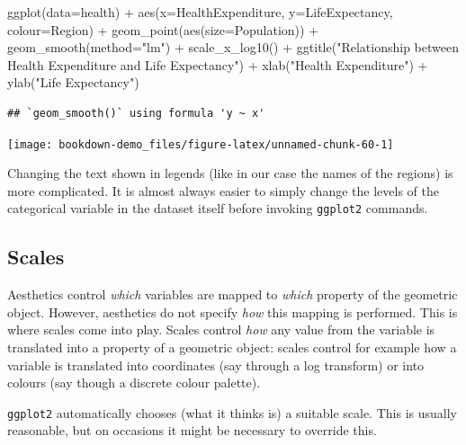 \documentclass[
]{book}
\newenvironment{Shaded}{\begin{snugshade}}{\end{snugshade}}
\newcommand{\AttributeTok}[1]{\textcolor[rgb]{0.77,0.63,0.00}{#1}}
\newcommand{\FunctionTok}[1]{\textcolor[rgb]{0.00,0.00,0.00}{#1}}
\newcommand{\NormalTok}[1]{#1}
\newcommand{\SpecialCharTok}[1]{\textcolor[rgb]{0.00,0.00,0.00}{#1}}
\newcommand{\StringTok}[1]{\textcolor[rgb]{0.31,0.60,0.02}{#1}}
\begin{document}
\begin{Shaded}
\begin{Highlighting}[]
\FunctionTok{ggplot}\NormalTok{(}\AttributeTok{data=}\NormalTok{health) }\SpecialCharTok{+} 
    \FunctionTok{aes}\NormalTok{(}\AttributeTok{x=}\NormalTok{HealthExpenditure,  }\AttributeTok{y=}\NormalTok{LifeExpectancy, }\AttributeTok{colour=}\NormalTok{Region) }\SpecialCharTok{+}
    \FunctionTok{geom\_point}\NormalTok{(}\FunctionTok{aes}\NormalTok{(}\AttributeTok{size=}\NormalTok{Population)) }\SpecialCharTok{+}
    \FunctionTok{geom\_smooth}\NormalTok{(}\AttributeTok{method=}\StringTok{"lm"}\NormalTok{)  }\SpecialCharTok{+}
    \FunctionTok{scale\_x\_log10}\NormalTok{() }\SpecialCharTok{+}
    \FunctionTok{ggtitle}\NormalTok{(}\StringTok{"Relationship between Health Expenditure and Life Expectancy"}\NormalTok{) }\SpecialCharTok{+}
    \FunctionTok{xlab}\NormalTok{(}\StringTok{"Health Expenditure"}\NormalTok{) }\SpecialCharTok{+}
    \FunctionTok{ylab}\NormalTok{(}\StringTok{"Life Expectancy"}\NormalTok{)    }
\end{Highlighting}
\end{Shaded}

\begin{verbatim}
## `geom_smooth()` using formula 'y ~ x'
\end{verbatim}

\texttt{[image: bookdown-demo\_files/figure-latex/unnamed-chunk-60-1]}

Changing the text shown in legends (like in our case the names of the regions) is more complicated. It is almost always easier to simply change the levels of the categorical variable in the dataset itself before invoking \texttt{ggplot2} commands.

\hypertarget{scales}{%
\subsection{Scales}\label{scales}}

Aesthetics control \emph{which} variables are mapped to \emph{which} property of the geometric object. However, aesthetics do not specify \emph{how} this mapping is performed. This is where scales come into play. Scales control \emph{how} any value from the variable is translated into a property of a geometric object: scales control for example how a variable is translated into coordinates (say through a log transform) or into colours (say though a discrete colour palette).

\texttt{ggplot2} automatically chooses (what it thinks is) a suitable scale. This is usually reasonable, but on occasions it might be necessary to override this.
\end{document}

